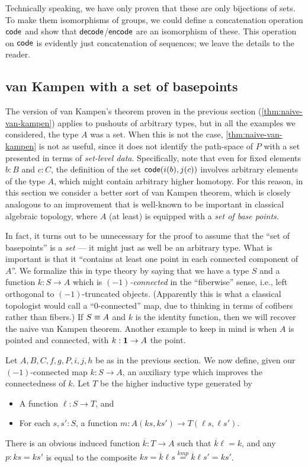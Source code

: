 Technically speaking, we have only proven that these are only bijections of sets.
To make them isomorphisms of groups, we could define a concatenation operation $\mathsf{code}$ and show that $\mathsf{decode}$/$\mathsf{encode}$ are an isomorphism of these.
This operation on $\mathsf{code}$ is evidently just concatenation of sequences; we leave the details to the reader.


\subsection{van Kampen with a set of basepoints}
\label{sec:better-vankampen}

The version of van Kampen's theorem proven in the previous section (\autoref{thm:naive-van-kampen}) applies to pushouts of arbitrary types, but in all the examples we considered, the type $A$ was a set.
When this is not the case, \autoref{thm:naive-van-kampen} is not as useful, since it does not identify the path-space of $P$ with a set presented in terms of \emph{set-level data}.
Specifically, note that even for fixed elements $b:B$ and $c:C$, the definition of the set $\mathsf{code}(i(b),j(c))$ involves arbitrary elements of the type $A$, which might contain arbitrary higher homotopy.
For this reason, in this section we consider a better sort of van Kampen theorem, which is closely analogous to an improvement that is well-known to be important in classical algebraic topology, where $A$ (at least) is equipped with a \emph{set of base points}.

In fact, it turns out to be unnecessary for the proof to assume that the ``set of basepoints'' is a \emph{set} --- it might just as well be an arbitrary type.
What is important is that it ``contains at least one point in each connected component of $A$''.
We formalize this in type theory by saying that we have a type $S$ and a function $k:S \to A$ which is \emph{$(-1)$-connected} in the ``fiberwise'' sense, i.e., left orthogonal to $(-1)$-truncated objects.
(Apparently this is what a classical topologist would call a ``$0$-connected'' map, due to thinking in terms of cofibers rather than fibers.)
If $S\equiv A$ and $k$ is the identity function, then we will recover the naive van Kampen theorem.
Another example to keep in mind is when $A$ is pointed and connected, with $k:\mathbf{1}\to A$ the point.

Let $A,B,C,f,g,P,i,j,h$ be as in the previous section.
We now define, given our $(-1)$-connected map $k:S\to A$, an auxiliary type which improves the connectedness of $k$.
Let $T$ be the higher inductive type generated by
\begin{itemize}
\item A function $\ell:S\to T$, and
\item For each $s,s':S$, a function $m:A(ks,ks') \to T(\ell s, \ell s')$.
\end{itemize}
\newcommand{\kbar}{\overline{k}}
There is an obvious induced function $\kbar:T\to A$ such that $\kbar \ell = k$, and any $p:ks=ks'$ is equal to the composite $ks = \kbar \ell s \overset{\kbar m p}{=} \kbar \ell s' = k s'$.

